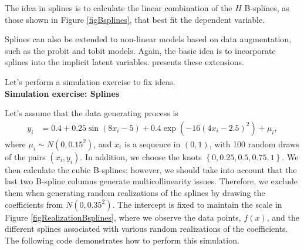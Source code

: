 The idea in splines is to calculate the linear combination of the $H$ B-splines, as those shown in Figure \ref{figBsplines}, that best fit the dependent variable.

Splines can also be extended to non-linear models based on data augmentation, such as the probit and tobit models. Again, the basic idea is to incorporate splines into the implicit latent variables. \cite[Chap.~10]{koop2003bayesian} presents these extensions.

Let's perform a simulation exercise to fix ideas.\\

\textbf{Simulation exercise: Splines}

Let's assume that the data generating process is
\begin{align*}
	y_i & = 0.4 + 0.25\sin(8x_i - 5) + 0.4\exp(-16(4x_i - 2.5)^2) + \mu_i,
\end{align*}
where $\mu_i \sim N(0,0.15^2)$, and $x_i$ is a sequence in $(0,1)$, with 100 random draws of the pairs $(x_i, y_i)$. In addition, we choose the knots $\left\{0, 0.25, 0.5, 0.75, 1\right\}$. We then calculate the cubic B-splines; however, we should take into account that the last two B-spline columns generate multicollinearity issues. Therefore, we exclude them when generating random realizations of the splines by drawing the coefficients from $N(0, 0.35^2)$. The intercept is fixed to maintain the scale in Figure \ref{figRealizationBsplines}, where we observe the data points, $f(x)$, and the different splines associated with various random realizations of the coefficients. The following code demonstrates how to perform this simulation.

